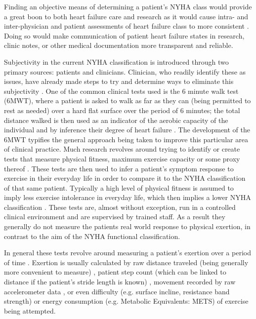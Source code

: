 \documentclass[]{article}
\begin{document}
Finding an objective means of determining a patient's NYHA class would provide a great boon to both heart failure care and research as it would cause intra- and inter-physician and patient assessments of heart failure class to more consistent \cite{Goldman1981,Bennett2002, Williams2017}. Doing so would make communication of patient heart failure states in research, clinic notes, or other medical documentation more transparent and reliable.

Subjectivity in the current NYHA classification is introduced through two primary sources: patients and clinicians. Clinician, who readily identify these as issues, have already made steps to try and determine ways to eliminate this subjectivity \cite{Bennett2002}. One of the common clinical tests used is the 6 minute walk test (6MWT), where a patient is asked to walk as far as they can (being permitted to rest as needed) over a hard flat surface over the period of 6 minutes; the total distance walked is then used as an indicator of the aerobic capacity of the individual and by inference their degree of heart failure \cite{Roul1998}. The development of the 6MWT typifies the general approach being taken to improve this particular area of clinical practice. Much research revolves around trying to identify or create tests that measure physical fitness, maximum exercise capacity or some proxy thereof \cite{Balady,Uth2004,Kline1987,Cooper1969,Saalasti2012,Butte2012,Ap5072017,Zhao2017}. These tests are then used to infer a patient's symptom response to exercise in their everyday life in order to compare it to the NYHA classification of that same patient. Typically a high level of physical fitness is assumed to imply less exercise intolerance in everyday life, which then implies a lower NYHA classification \cite{Balady,Saalasti2012,Zhao2017}. These tests are, almost without exception, run in a controlled clinical environment and are supervised by trained staff. As a result they generally do not measure the patients real world response to physical exertion, in contrast to the aim of the NYHA functional classification.

In general these tests revolve around measuring a patient's exertion over a period of time \cite{Balady,Cooper1969,Kline1987,Saalasti2012,Ap5072017,Zhao2017,Roul1998}. Exertion is usually calculated by raw distance traveled (being generally more convenient to measure) \cite{Saalasti2012,Kline1987,Balady,Roul1998}, patient step count (which can be linked to distance if the patient's stride length is known) \cite{Abdulmajeed2016,Eapen2016a,Wen2017,El-Amrawy2015,Ap5072017,An2017,Bromberg2015,Abeles2017}, movement recorded by raw accelerometer data \cite{Zhao2017,Bornstein2011,Awais2015,Jehn2013}, or even difficulty (e.g. surface incline, resistance band strength) \cite{Abdulmajeed2016,Bromberg2015} or energy consumption (e.g. Metabolic Equivalents: METS) \cite{HeartFoundation2014,Balady,Butte2012} of exercise being attempted.
\end{document}
